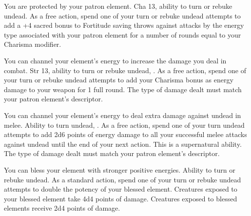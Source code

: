 
{You are protected by your patron element.}
{Cha 13, ability to turn or rebuke undead.}
{As a free action, spend one of your turn or rebuke undead attempts to add a +4 sacred bonus to Fortitude saving throws against attacks by the energy type associated with your patron element for a number of rounds equal to your Charisma modifier.}
{}{}

{You can channel your element's energy to increase the damage you deal in combat.}
{Str 13, ability to turn or rebuke undead, .}
{As a free action, spend one of your turn or rebuke undead attempts to add your Charisma bonus as energy damage to your weapon for 1 full round. The type of damage dealt must match your patron element's descriptor.}
{}{}

{You can channel your element's energy to deal extra damage against undead in melee.}
{Ability to turn undead, .}
{As a free action, spend one of your turn undead attempts to add 2d6 points of energy damage to all your successful melee attacks against undead until the end of your next action. This is a supernatural ability. The type of damage dealt must match your patron element's descriptor.}
{}{}

{You can bless your element with stronger positive energies.}
{Ability to turn or rebuke undead.}
{As a standard action, spend one of your turn or rebuke undead attempts to double the potency of your blessed element. Creatures exposed to your blessed element take 4d4 points of damage.}
{Creatures exposed to blessed elements receive 2d4 points of damage.}
{}